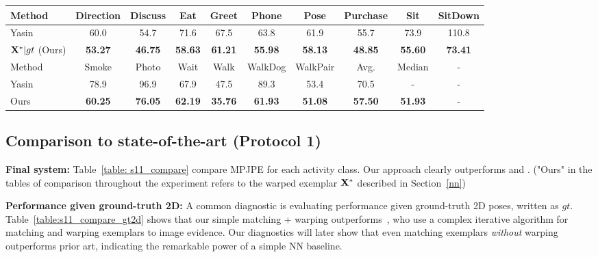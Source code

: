 \documentclass[10pt,twocolumn,letterpaper]{article}
\begin{document}
\begin{table*}[t!]
\centering
\begin{tabular}{|l|c|c|c|c|c|c|c|c|c|}
\hline
Method & Direction & Discuss & Eat & Greet & Phone & Pose & Purchase & Sit & SitDown\\
\hline
\hline
Yasin \cite{Yasin_2016_CVPR} & 60.0 & 54.7 & 71.6 & 67.5 & 63.8 & 61.9 & 55.7 & 73.9 & 110.8 \\
\hline
${\bf X}^*|gt$ (Ours) &\textbf{53.27} &\textbf{46.75} &\textbf{58.63} &\textbf{61.21} &\textbf{55.98} &\textbf{58.13} &\textbf{48.85} &\textbf{55.60} &\textbf{73.41}\\
\hline
\hline
Method & Smoke & Photo & Wait & Walk & WalkDog & WalkPair & Avg. & Median & -\\
\hline
\hline
Yasin \cite{Yasin_2016_CVPR} & 78.9 & 96.9 & 67.9 & 47.5 & 89.3 & 53.4 & 70.5 & -&- \\
\hline
Ours &\textbf{60.25} &\textbf{76.05} &\textbf{62.19} &\textbf{35.76} &\textbf{61.93} &\textbf{51.08} & \textbf{57.50} & \textbf{51.93}&-\\
\hline
\end{tabular}
\caption{Comparison to \cite{Yasin_2016_CVPR} by \textbf{Protocol 1} given 2D ground truth. Our approach is clearly state-of-the-art, indicating the effectiveness of our simple approach to NN matching and warping. Table~\ref{table: gt2d_nn_comp} shows that even simple NN matching produces an average accuracy of 70.93, rivaling prior art.}
\label{table:s11_compare_gt2d}
\end{table*}

\subsection{Comparison to state-of-the-art (Protocol 1)}

{\bf Final system:} Table~\ref{table: s11_compare} compare MPJPE for each activity class. Our approach clearly outperforms \cite{Yasin_2016_CVPR} and \cite{rogez2016mocap}. ("Ours" in the tables of comparison throughout the experiment refers to the warped exemplar ${\bf X}^*$ described in Section~\ref{nn}) 

{\bf Performance given ground-truth 2D:} A common diagnostic is evaluating performance given ground-truth 2D poses, written as $gt$. Table~\ref{table:s11_compare_gt2d} shows that our simple matching + warping outperforms~\cite{Yasin_2016_CVPR}, who use a complex iterative algorithm for matching and warping exemplars to image evidence. Our diagnostics will later show that even matching exemplars {\em without} warping outperforms prior art, indicating the remarkable power of a simple NN baseline.
\end{document}
